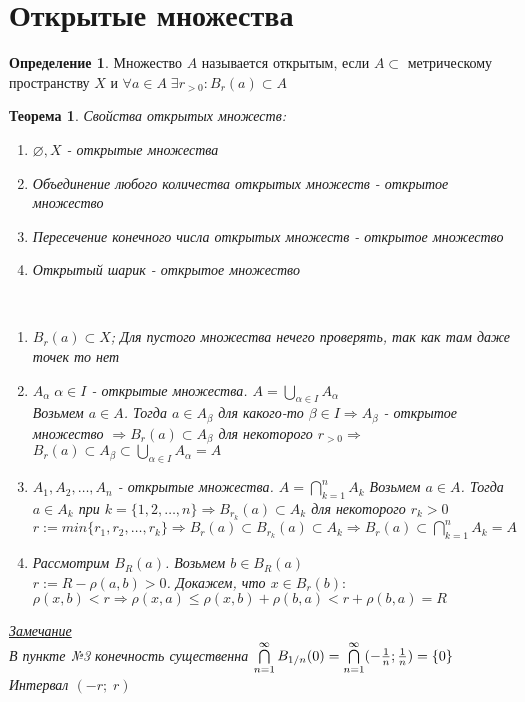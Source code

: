 \documentclass[12pt,letterpaper]{report}
\makeatletter
\newtheorem*{theorem-non}{Теорема}
\theoremstyle{definition}
\newtheorem*{conj}{Определение}
\newcommand{\notice}{\underline{\textit{Замечание }}}
\renewenvironment{proof}[1][\proofname]{%
   \par\pushQED{\qed}\normalfont%
   \topsep6\p@\@plus6\p@\relax
   \trivlist\item[\hskip\labelsep\bfseries#1\@addpunct{.}]%
   \ignorespaces
}{%
   \popQED\endtrivlist\@endpefalse
}
\makeatother
\begin{document}
\section{Открытые множества}
\begin{conj}
    Множество $A$ называется открытым, если $A \subset $ метрическому пространству $X$ и $\forall a \in A \; \exists r_{>0} : B_r(a) \subset A$
\end{conj}
\begin{theorem-non}
    Свойства открытых множеств:
    \begin{enumerate}
        \item $\varnothing, X$ - открытые множества 
        \item Объединение любого количества открытых множеств - открытое множество
        \item Пересечение конечного числа открытых множеств - открытое множество
        \item Открытый шарик - открытое множество
    \end{enumerate}
    \begin{proof}
        \quad \\
        \begin{enumerate}
            \item $B_r(a) \subset X$; Для пустого множества нечего проверять, так как там даже точек то нет
            \item $A_{\alpha} \; \alpha \in I$ - открытые множества. $A = \bigcup\limits_{\alpha \in I} A_{\alpha}$ \\
            Возьмем $a \in A$. Тогда $a \in A_{\beta}$ для какого-то $\beta \in I \Longrightarrow A_{\beta}$ - открытое множество 
            $\Longrightarrow B_r(a) \subset A_{\beta}$ для некоторого $r_{>0} \Longrightarrow$ \\
            $B_r(a) \subset A_{\beta} \subset \bigcup\limits_{\alpha \in I} A_{\alpha} = A$
            \item $A_1, A_2, \dots , A_n$ - открытые множества. $A = \bigcap\limits_{k = 1}^{n} A_k$
            Возьмем $a \in A$. Тогда $a \in A_k$ при $k = \{1, 2, \dots , n\} \Longrightarrow
            B_{r_k}(a) \subset A_k$ для некоторого $r_k > 0$ \\
            $r := min\{r_1, r_2, \dots , r_k\} \Longrightarrow B_r(a) \subset B_{r_k}(a) \subset A_k 
            \Longrightarrow B_r(a) \subset \bigcap\limits_{k=1}^n A_k = A$
            \item Рассмотрим $B_R(a)$. Возьмем $b \in B_R(a)$ \\
            $r := R-\rho(a, b) > 0$.
            Докажем, что $x \in B_r(b):$ \\
            $\rho(x, b) < r \Longrightarrow \rho(x,a) \leqslant \rho(x, b) + \rho(b,a) < r + \rho(b,a) = R$
        \end{enumerate}
    \end{proof}
    \notice \\
    В пункте №3 конечность существенна
    $\bigcap\limits_{n=1}^{\infty} B_{1/n}(0) = \bigcap\limits_{n=1}^{\infty}(-{{1}\over{n}}; {{1}\over{n}}) = \{0\}$ Интервал $(-r; \; r)$
\end{theorem-non}
\end{document}
